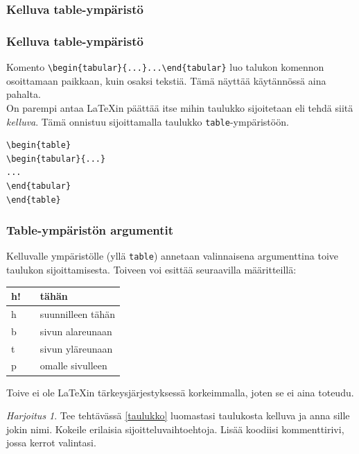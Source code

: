 \documentclass[handout]{beamer}
\theoremstyle{remark}
\newtheorem{harj}{Harjoitus}[section]
\newcommand{\vaihto}{\\ \vspace{10pt}}
\begin{document}
\subsubsection{Kelluva table-ympäristö}
\begin{frame}[fragile]
\frametitle{Kelluva table-ympäristö}
Komento \verb-\begin{tabular}{...}...\end{tabular}- luo talukon komennon osoittamaan paikkaan, kuin osaksi tekstiä. Tämä näyttää käytännössä aina pahalta. 
\vaihto
On parempi antaa \LaTeX in päättää itse mihin taulukko sijoitetaan eli tehdä siitä \emph{kelluva}. Tämä onnistuu sijoittamalla taulukko \verb-table--ympäristöön.
\begin{table}
\begin{scriptsize}
\begin{Verbatim}[frame=single]
\begin{table}
\begin{tabular}{...}
...
\end{tabular}
\end{table}
\end{Verbatim}
\end{scriptsize} 
\end{table}
\end{frame}
\begin{frame}[fragile]
\frametitle{Table-ympäristön argumentit}
Kelluvalle ympäristölle (yllä \verb-table-) annetaan valinnaisena argumenttina toive taulukon sijoittamisesta. Toiveen voi esittää seuraavilla määritteillä:
\begin{table}
\begin{tabular}{lcl}

h! && tähän\\
\hline
h && suunnilleen tähän\\
\hline
b && sivun alareunaan\\
\hline
t && sivun yläreunaan\\
\hline
p && omalle sivulleen\\

\end{tabular}
\end{table}
Toive ei ole \LaTeX in tärkeysjärjestyksessä korkeimmalla, joten se ei aina toteudu.
\end{frame}
\begin{frame}[fragile]
\begin{harj}\label{kelluvaTaulukko}
Tee tehtävässä \ref{taulukko} luomastasi taulukosta kelluva ja anna sille jokin nimi. Kokeile erilaisia sijoitteluvaihtoehtoja. Lisää koodiisi kommenttirivi, jossa kerrot valintasi. 
\end{harj}

\end{frame}
\end{document}
